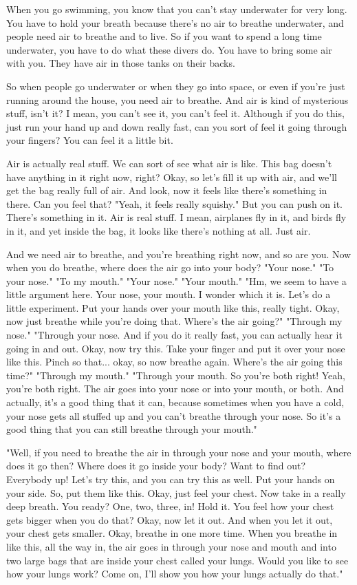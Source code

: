 When you go swimming, you know that you can't stay underwater for very long. You have to hold your breath because there's no air to breathe underwater, and people need air to breathe and to live. So if you want to spend a long time underwater, you have to do what these divers do. You have to bring some air with you. They have air in those tanks on their backs.

So when people go underwater or when they go into space, or even if you're just running around the house, you need air to breathe. And air is kind of mysterious stuff, isn't it? I mean, you can't see it, you can't feel it. Although if you do this, just run your hand up and down really fast, can you sort of feel it going through your fingers? You can feel it a little bit.

Air is actually real stuff. We can sort of see what air is like. This bag doesn't have anything in it right now, right? Okay, so let's fill it up with air, and we'll get the bag really full of air. And look, now it feels like there's something in there. Can you feel that?
"Yeah, it feels really squishy."
But you can push on it. There's something in it. Air is real stuff. I mean, airplanes fly in it, and birds fly in it, and yet inside the bag, it looks like there's nothing at all. Just air.

And we need air to breathe, and you're breathing right now, and so are you. Now when you do breathe, where does the air go into your body?
"Your nose."
"To your nose."
"To my mouth."
"Your nose."
"Your mouth."
"Hm, we seem to have a little argument here. Your nose, your mouth. I wonder which it is. Let's do a little experiment. Put your hands over your mouth like this, really tight. Okay, now just breathe while you're doing that. Where's the air going?"
"Through my nose."
"Through your nose. And if you do it really fast, you can actually hear it going in and out. Okay, now try this. Take your finger and put it over your nose like this. Pinch so that... okay, so now breathe again. Where's the air going this time?"
"Through my mouth."
"Through your mouth. So you're both right! Yeah, you're both right. The air goes into your nose or into your mouth, or both. And actually, it's a good thing that it can, because sometimes when you have a cold, your nose gets all stuffed up and you can't breathe through your nose. So it's a good thing that you can still breathe through your mouth."

"Well, if you need to breathe the air in through your nose and your mouth, where does it go then? Where does it go inside your body? Want to find out? Everybody up! Let's try this, and you can try this as well. Put your hands on your side. So, put them like this. Okay, just feel your chest. Now take in a really deep breath. You ready? One, two, three, in! Hold it. You feel how your chest gets bigger when you do that? Okay, now let it out. And when you let it out, your chest gets smaller. Okay, breathe in one more time. When you breathe in like this, all the way in, the air goes in through your nose and mouth and into two large bags that are inside your chest called your lungs. Would you like to see how your lungs work? Come on, I'll show you how your lungs actually do that."


